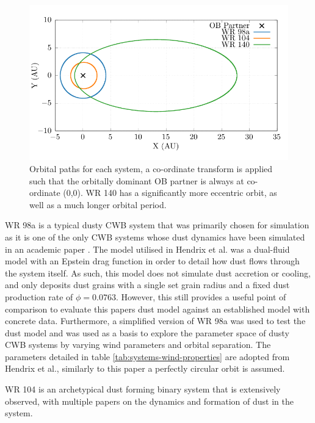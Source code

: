 \begin{figure}
  \centering
  \includegraphics{assets/orbits/orbits-transform.pdf}
  \caption[Orbital path comparison]{Orbital paths for each system, a co-ordinate transform is applied such that the orbitally dominant OB partner is always at co-ordinate (0,0). WR 140 has a significantly more eccentric orbit, as well as a much longer orbital period.}
  \label{fig:orbits-diag}
\end{figure}

WR 98a is a typical dusty CWB system that was primarily chosen for simulation as it is one of the only CWB systems whose dust dynamics have been simulated in an academic paper \parencite{hendrix_pinwheels_2016}. The model utilised in Hendrix et al. was a dual-fluid model with an Epstein drag function in order to detail how dust flows through the system itself. As such, this model does not simulate dust accretion or cooling, and only deposits dust grains with a single set grain radius and a fixed dust production rate of $\phi = 0.0763$. However, this still provides a useful point of comparison to evaluate this papers dust model against an established model with concrete data. Furthermore, a simplified version of WR 98a was used to test the dust model and was used as a basis to explore the parameter space of dusty CWB systems by varying wind parameters and orbital separation. The parameters detailed in table \ref{tab:systems-wind-properties} are adopted from Hendrix et al., similarly to this paper a perfectly circular orbit is assumed.


WR 104 is an archetypical dust forming binary system that is extensively observed, with multiple papers on the dynamics and formation of dust in the system. %

